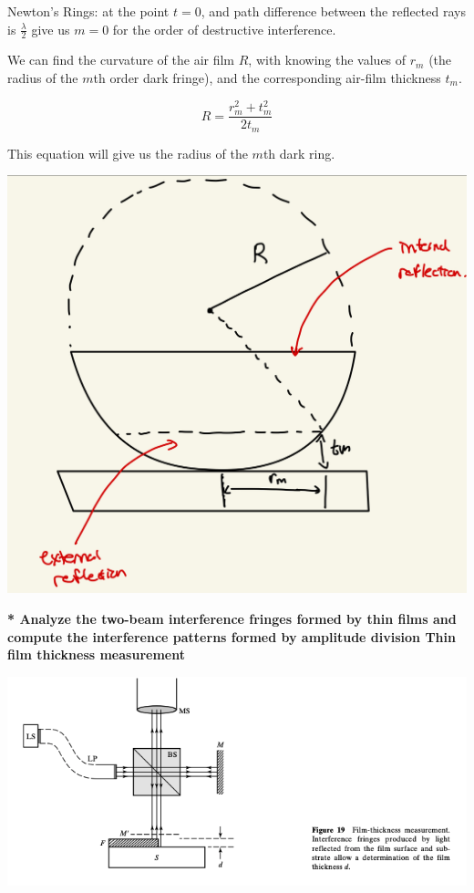 \documentclass[10pt]{article}
\newcommand*{\lo}[1]{
    \textbf{* #1} \newline
}
\begin{document}
\newpage

Newton's Rings: at the point $t = 0$, and path difference between the reflected rays is $\frac{\lambda}{2}$ give us $m=0$ for the order of destructive interference.

\newblock

We can find the curvature of the air film $R$, with knowing the values of $r_m$ (the radius of the $m$th order dark fringe), and the corresponding air-film thickness $t_m$.

\[R = \frac{r_m^2+t_m^2}{2t_m}\]

This equation will give us the radius of the $m$th dark ring.

\begin{center}
    \includegraphics*[scale = .2]{imgs/newton-ring-1.jpeg}
\end{center}

\lo{Analyze the two-beam interference fringes formed by thin films and compute the interference patterns formed by amplitude division Thin film thickness measurement}

\begin{center}
    \includegraphics*[scale = .5]{imgs/measure-film-thickness.png}
\end{center}
\end{document}
